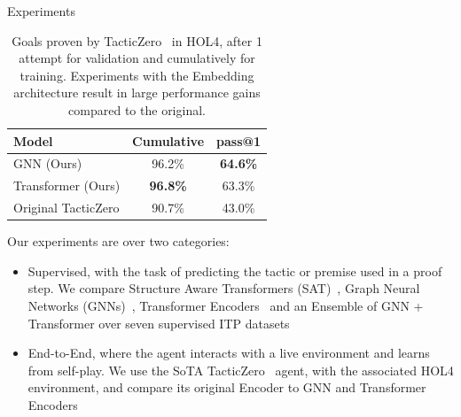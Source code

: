 \documentclass[final]{beamer}
\newlength{\onecolwid}
\newlength{\twocolwid}
\begin{document}
\begin{frame}[t]
\begin{columns}[t]
\begin{column}{\twocolwid}
\begin{columns}[t,totalwidth=\twocolwid]
\begin{column}{\onecolwid}


                        \begin{block}{Experiments}

                            \begin{table}[h]
                                \centering
                                \begin{tabular}{lcc}
                                    \toprule
                                    Model               & Cumulative      & pass@1          \\
                                    \midrule
                                    GNN (Ours)          & 96.2\%          & \textbf{64.6\%} \\
                                    Transformer (Ours)  & \textbf{96.8\%} & 63.3\%          \\
                                    Original TacticZero & 90.7\%          & 43.0\%          \\
                                    \bottomrule
                                \end{tabular}
                                \caption{ Goals proven by TacticZero~\cite{wu_tacticzero_2021} in HOL4, after 1 attempt for validation and cumulatively for training.
                                Experiments with the Embedding architecture result in large performance gains compared to the original.}
                                \label{fig:tz_plotfirst}
                            \end{table}%

                            Our experiments are over two categories:

                            \begin{itemize}
                                \item Supervised, with the task of predicting the tactic or premise used in a proof step.
                                We compare Structure Aware Transformers (SAT)~\cite{chen_structure-aware_2022, luo_transformers_2023},
                                Graph Neural Networks (GNNs)~\cite{wang_premise_2017}, Transformer Encoders~\cite{vaswani_attention_2017} and an Ensemble of GNN + Transformer over seven supervised ITP datasets
                                \item End-to-End, where the agent interacts with a live environment and learns from self-play.
                                We use the SoTA TacticZero~\cite{wu_tacticzero_2021} agent, with the associated HOL4 environment, and compare its original Encoder to GNN and Transformer Encoders
                            \end{itemize}



\end{block}
\end{column}
\end{columns}
\end{column}
\end{columns}
\end{frame}
\end{document}
